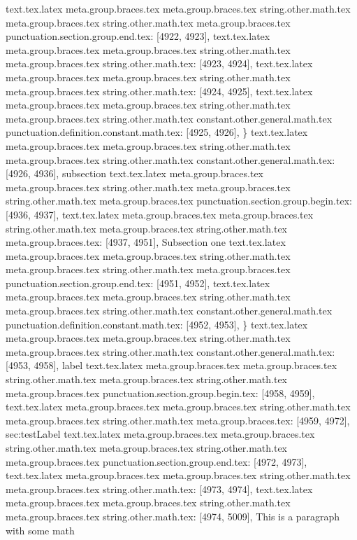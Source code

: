 {{{{{{{{{{{{{{{{{{{{{{{{{{{{{{{{{{{{{{{{{{{{{{{{{{{{{{{{{{{{{{{{{{{{{{{{{{{{{{{{{{{{{{{{{{{{{{{{{{{{{{{{{{{{{{{{{{{{{{{{{{{{{{{{{{{{{{{{{{{{{{{{{{text.tex.latex meta.group.braces.tex meta.group.braces.tex string.other.math.tex meta.group.braces.tex string.other.math.tex meta.group.braces.tex punctuation.section.group.end.tex: [4922, 4923], {}}
text.tex.latex meta.group.braces.tex meta.group.braces.tex string.other.math.tex meta.group.braces.tex string.other.math.tex: [4923, 4924], {
}
text.tex.latex meta.group.braces.tex meta.group.braces.tex string.other.math.tex meta.group.braces.tex string.other.math.tex: [4924, 4925], {
}
text.tex.latex meta.group.braces.tex meta.group.braces.tex string.other.math.tex meta.group.braces.tex string.other.math.tex constant.other.general.math.tex punctuation.definition.constant.math.tex: [4925, 4926], {\}
text.tex.latex meta.group.braces.tex meta.group.braces.tex string.other.math.tex meta.group.braces.tex string.other.math.tex constant.other.general.math.tex: [4926, 4936], {subsection}
text.tex.latex meta.group.braces.tex meta.group.braces.tex string.other.math.tex meta.group.braces.tex string.other.math.tex meta.group.braces.tex punctuation.section.group.begin.tex: [4936, 4937], {{}
text.tex.latex meta.group.braces.tex meta.group.braces.tex string.other.math.tex meta.group.braces.tex string.other.math.tex meta.group.braces.tex: [4937, 4951], {Subsection one}
text.tex.latex meta.group.braces.tex meta.group.braces.tex string.other.math.tex meta.group.braces.tex string.other.math.tex meta.group.braces.tex punctuation.section.group.end.tex: [4951, 4952], {}}
text.tex.latex meta.group.braces.tex meta.group.braces.tex string.other.math.tex meta.group.braces.tex string.other.math.tex constant.other.general.math.tex punctuation.definition.constant.math.tex: [4952, 4953], {\}
text.tex.latex meta.group.braces.tex meta.group.braces.tex string.other.math.tex meta.group.braces.tex string.other.math.tex constant.other.general.math.tex: [4953, 4958], {label}
text.tex.latex meta.group.braces.tex meta.group.braces.tex string.other.math.tex meta.group.braces.tex string.other.math.tex meta.group.braces.tex punctuation.section.group.begin.tex: [4958, 4959], {{}
text.tex.latex meta.group.braces.tex meta.group.braces.tex string.other.math.tex meta.group.braces.tex string.other.math.tex meta.group.braces.tex: [4959, 4972], {sec:testLabel}
text.tex.latex meta.group.braces.tex meta.group.braces.tex string.other.math.tex meta.group.braces.tex string.other.math.tex meta.group.braces.tex punctuation.section.group.end.tex: [4972, 4973], {}}
text.tex.latex meta.group.braces.tex meta.group.braces.tex string.other.math.tex meta.group.braces.tex string.other.math.tex: [4973, 4974], {
}
text.tex.latex meta.group.braces.tex meta.group.braces.tex string.other.math.tex meta.group.braces.tex string.other.math.tex: [4974, 5009], {This is a paragraph with some math }
}}}}}}}}}}}}}}}}}}}}}}}}}}}}}}}}}}}}}}}}}}}}}}}}}}}}}}}}}}}}}}}}}}}}}}}}}}}}}}}}}}}}}}}}}}}}}}}}}}}}}}}}}}}}}}}}}}}}}}}}}}}}}}}}}}}}}}}}}}}}}}}}}}}
